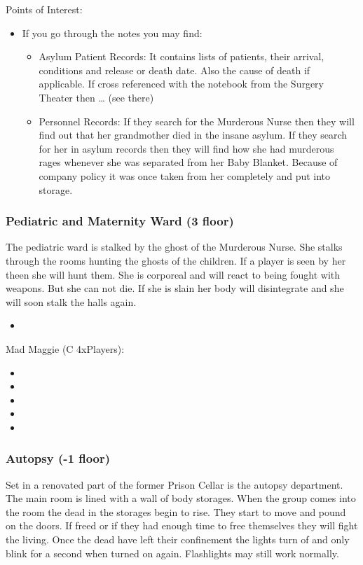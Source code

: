 \documentclass[11pt]{article}
\begin{document}
{Points of Interest:
\begin{itemize}
\item If you go through the notes you may find:
\begin{itemize}
\item Asylum Patient Records: It contains lists of patients, their arrival, conditions and release or death date. Also the cause of death if applicable. If cross referenced with the notebook from the Surgery Theater then \ldots{} (see there)
\item Personnel Records: If they search for the Murderous Nurse then they will find out that her grandmother died in the insane asylum. If they search for her in asylum records then they will find how she had murderous rages whenever she was separated from her Baby Blanket. Because of company policy it was once taken from her completely and put into storage.
\end{itemize}
\end{itemize}
\subsubsection{Pediatric and Maternity Ward (3 floor)}
\label{sec:org074d236}

The pediatric ward is stalked by the ghost of the Murderous Nurse. She stalks through the rooms hunting the ghosts of the children. If a player is seen by her theen she will hunt them. She is corporeal and will react to being fought with weapons. But she can not die. If she is slain her body will disintegrate and she will soon stalk the halls again.

\begin{itemize}
\item {}
\end{itemize}

Mad Maggie (C 4xPlayers):
\begin{itemize}
\item {}
\item {}
\item {}
\item {}
\item {}
\end{itemize}
\subsubsection{Autopsy (-1 floor)}
\label{sec:orge03fcad}
Set in a renovated part of the former Prison Cellar is the autopsy department. The main room is lined with a wall of body storages.
When the group comes into the room the dead in the storages begin to rise. They start to move and pound on the doors. If freed or if they had enough time to free themselves they will fight the living. Once the dead have left their confinement the lights turn of and only blink for a second when turned on again. Flashlights may still work normally.

}
\end{document}
